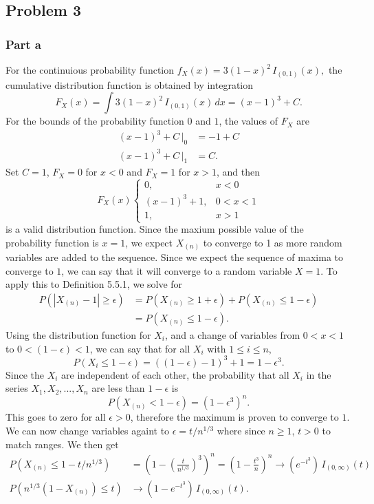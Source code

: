\documentclass{article}
\begin{document}
\subsection*{Problem 3}
\subsubsection*{Part a}
For the continuious probability function $f_X(x) = 3(1-x)^2\,I_{(0,1)}(x),$ the cumulative distribution function is obtained by integration \[F_X(x) = \int 3(1-x)^2\,I_{(0,1)}(x)\,dx = (x-1)^3 + C.\] For the bounds of the probability function $0$ and $1$, the values of $F_X$ are 
\[\begin{aligned}
(x-1)^3 + C\,\big|_0 &= -1 + C \\
(x-1)^3 + C\,\big|_1 &= C.
\end{aligned}\]
Set $C = 1$, $F_X = 0$ for $x < 0$ and $F_X = 1$ for $x > 1$, and then 
\[F_X(x) \begin{cases}
0, &x<0\\
(x-1)^3 + 1, & 0<x<1 \\
1, &x>1\end{cases}\] is a valid distribution function. Since the maxium possible value of the probability function is $x=1$, we expect $X_{(n)}$ to converge to 1 as more random variables are added to the sequence. Since we expect the sequence of maxima to converge to $1$, we can say that it will converge to a random variable $X=1$. To apply this to Definition 5.5.1, we solve for 
\[\begin{aligned}
P\left(\left|X_{(n)}-1\right|\geq\epsilon\right) &= P\left(X_{(n)}\geq 1+\epsilon\right) + P\left(X_{(n)} \leq 1 - \epsilon\right) \\
&=  P\left(X_{(n)} \leq 1 - \epsilon\right).
\end{aligned}\]
Using the distribution function for $X_i$, and a change of variables from $0 < x < 1$ to $0 < (1-\epsilon) < 1$, we can say that for all $X_i$ with $1\leq i\leq n$,
\[ P(X_i \leq 1 - \epsilon) = \left((1-\epsilon)-1\right)^3+1 = 1 - \epsilon^3.\]
Since the $X_i$ are independent of each other, the probability that all $X_i$ in the series $X_1, X_2, ... , X_n$ are less than $1-\epsilon$ is \[P\left(X_{(n)} < 1 - \epsilon\right) = \left(1-\epsilon^3\right)^n.\] This goes to zero for all $\epsilon > 0$, therefore the maximum is proven to converge to $1$. We can now change variables againt to $\epsilon = t/n^{1/3}$ where since $n \geq 1$, $t > 0$ to match ranges. We then get
\[\begin{aligned}
P\left(X_{(n)} \leq 1 - t/n^{1/3}\right) &= \left(1-\left(\frac{t}{n^{1/3}}\right)^3\right)^n = \left(1-\frac{t^3}{n}\right)^n \to \left(e^{-t^3}\right)\, I_{(0,\infty)}(t) \\
P\left(n^{1/3}\left(1-X_{(n)}\right)\leq t\right) &\to \left(1 - e^{-t^3}\right)\,I_{(0,\infty)}(t).
\end{aligned}\]
\end{document}
